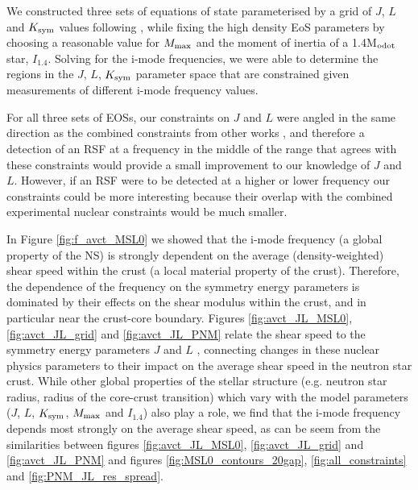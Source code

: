 \documentclass[fleqn,usenatbib]{mnras}
\begin{document}
We constructed three sets of equations of state parameterised by a grid of $J$, $L$ and $K_{\rm sym}$ values following \citet{newton2020nuclear}, while fixing the high density EoS parameters by choosing a reasonable value for $M_{\rm max}$ and the moment of inertia of a 1.4M$_{\rm odot}$ star, $I_{1.4}$. Solving for the i-mode frequencies, we were able to determine the regions in the $J$, $L$, $K_{\rm sym}$ parameter space that are constrained given measurements of different i-mode frequency values. 

For all three sets of EOSs, our constraints on $J$ and $L$ were angled in the same direction as the combined constraints from other works \citep{lattimer2013constraining}, and therefore a detection of an RSF at a frequency in the middle of the range that agrees with these constraints would provide a small improvement to our knowledge of $J$ and $L$. However, if an RSF were to be detected at a higher or lower frequency our constraints could be more interesting because their overlap with the combined experimental nuclear constraints would be much smaller.




In Figure \ref{fig:f_avct_MSL0} we showed that the i-mode frequency (a global property of the NS) is strongly dependent on the average (density-weighted) shear speed within the crust (a local material property of the crust). Therefore, the dependence of the frequency on the symmetry energy parameters is dominated by their effects on the shear modulus within the crust, and in particular near the crust-core boundary. Figures \ref{fig:avct_JL_MSL0}, \ref{fig:avct_JL_grid} and \ref{fig:avct_JL_PNM} relate the shear speed to the symmetry energy parameters $J$ and $L$ \citep[similar to Figure 1 of ][]{steiner2009constraints}, connecting changes in these nuclear physics parameters to their impact on the average shear speed in the neutron star crust. While other global properties of the stellar structure (e.g. neutron star radius, radius of the core-crust transition) which vary with the model parameters ($J$, $L$, $K_{\rm sym}$, $M_{\rm max}$ and $I_{1.4}$) also play a role, we find that the i-mode frequency depends most strongly on the average shear speed, as can be seem from the similarities between figures \ref{fig:avct_JL_MSL0}, \ref{fig:avct_JL_grid} and \ref{fig:avct_JL_PNM} and figures \ref{fig:MSL0_contours_20gap}, \ref{fig:all_constraints} and \ref{fig:PNM_JL_res_spread}.
\end{document}
